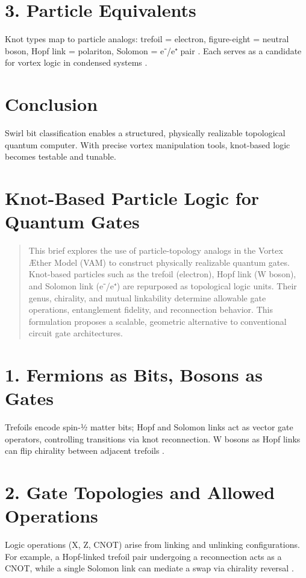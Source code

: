 \documentclass[a4paper,11pt]{article}
\begin{document}
\section*{3. Particle Equivalents}
Knot types map to particle analogs: trefoil = electron, figure-eight = neutral boson, Hopf link = polariton, Solomon = e⁻/e⁺ pair \cite{Iskandarani2025}. Each serves as a candidate for vortex logic in condensed systems \cite{Hall2016}.

\section*{Conclusion}
Swirl bit classification enables a structured, physically realizable topological quantum computer. With precise vortex manipulation tools, knot-based logic becomes testable and tunable.

\section{Knot-Based Particle Logic for Quantum Gates}
\begin{abstract}
This brief explores the use of particle-topology analogs in the Vortex Æther Model (VAM) to construct physically realizable quantum gates. Knot-based particles such as the trefoil (electron), Hopf link (W boson), and Solomon link (e⁻/e⁺) are repurposed as topological logic units. Their genus, chirality, and mutual linkability determine allowable gate operations, entanglement fidelity, and reconnection behavior. This formulation proposes a scalable, geometric alternative to conventional circuit gate architectures.
\end{abstract}


\section*{1. Fermions as Bits, Bosons as Gates}
Trefoils encode spin-½ matter bits; Hopf and Solomon links act as vector gate operators, controlling transitions via knot reconnection. W bosons as Hopf links can flip chirality between adjacent trefoils \cite{Iskandarani2025,Penrose2004}.

\section*{2. Gate Topologies and Allowed Operations}
Logic operations (X, Z, CNOT) arise from linking and unlinking configurations. For example, a Hopf-linked trefoil pair undergoing a reconnection acts as a CNOT, while a single Solomon link can mediate a swap via chirality reversal \cite{Berloff2014,Hall2016}.
\end{document}
